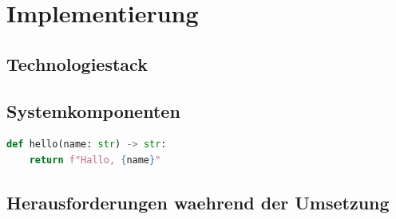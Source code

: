 \chapter{Implementierung}\label{chap:implementierung}

\section{Technologiestack}\label{sec:stack}

\section{Systemkomponenten}\label{sec:komponenten}

\begin{lstlisting}[language=Python, caption={Minimalbeispiel.}, label={lst:minimal}]
def hello(name: str) -> str:
    return f"Hallo, {name}"
\end{lstlisting}

\section{Herausforderungen waehrend der Umsetzung}\label{sec:herausforderungen}
